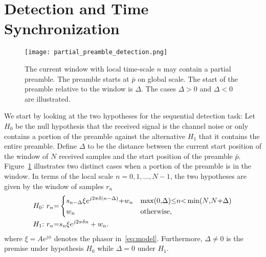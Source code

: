 \section{Detection and Time Synchronization}%
\label{sec:detection}

\begin{figure}[t]
  \centerline{\texttt{[image: partial\_preamble\_detection.png]}}
  \caption{The current window with local time-scale $n$ may contain a
    partial preamble. The preamble starts at $\bar{p}$ on global scale.
    The start of the preamble relative to the window is $\Delta$. The cases $\Delta >0$ and $\Delta < 0$
    are illustrated.}
  \label{fig:partial_preamble_detection}
  \end{figure}

We start by looking at the two hypotheses for the sequential detection task:
Let $H_0$ be the null hypothesis that the received signal is the
channel noise or only contains a portion of the preamble against the
alternative $H_1$ that it contains the entire preamble.  
Define $\Delta$ to be the distance between the current start position of the window
of $N$ received samples and the start position of the preamble $\bar{p}$.
Figure~\ref{fig:partial_preamble_detection} illustrates two distinct cases when a portion of the 
preamble is in the window.
In terms of the local scale $n=0,1,\ldots,N-1$, the two hypotheses are given by the window of samples $r_n$
\begin{equation}
  \label{eq:two hypotheses}
  \begin{aligned}
  &H_0{:}~r_n{=}
  \begin{dcases}
      s_{n-\Delta}\xi e^{j2\pi\delta (n-\Delta)}{+}w_n & \max(0{,}\Delta){\leq} n{<} \min(N{,}N{+}\Delta) \\
      w_n & \text{otherwise},
  \end{dcases} \\
  &H_1{:}~r_n{=}s_n\xi e^{j2\pi\delta n}+w_n.
  \end{aligned}
\end{equation}
where $\xi=Ae^{j\phi}$ denotes the phasor in~\eqref{eq:model}.
Furthermore, $\Delta \neq 0$ is the premise under hypothesis $H_0$
while $\Delta=0$ under $H_1$.  

